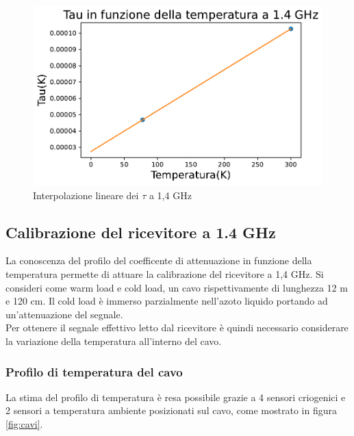 \begin{figure}[H]
	\centering
	\includegraphics[scale=0.8]{Tau_Temp_1,4.pdf}
	\caption{Interpolazione lineare dei $\tau$ a 1,4 GHz}
    	\label{fig:Tau_2.5}
\end{figure}



\subsection{Calibrazione del ricevitore a 1.4 GHz}

La conoscenza del profilo del coefficente di attenuazione in funzione della temperatura permette di attuare la calibrazione del ricevitore a 1,4 GHz. Si consideri come warm load e cold load, un cavo rispettivamente di lunghezza 12 m e 120 cm. Il cold load è immerso parzialmente nell'azoto liquido portando ad un'attenuazione del segnale.\\
Per ottenere il segnale effettivo letto dal ricevitore è quindi necessario considerare la variazione della temperatura all'interno del cavo.

\subsubsection{Profilo di temperatura del cavo}
\label{ssec:Profilo di temperatura del cavo}

La stima del profilo di temperatura è resa possibile grazie a 4 sensori criogenici e 2 sensori a temperatura ambiente posizionati sul cavo, come mostrato in figura \ref{fig:cavi}. 

